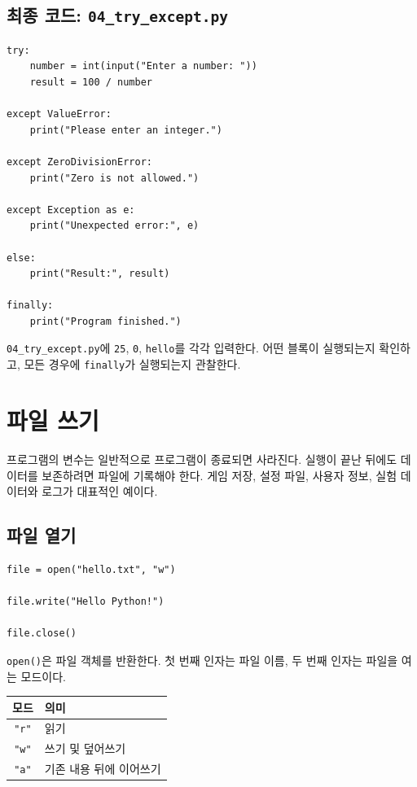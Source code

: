 \documentclass[11pt,a4paper]{article}
\begin{document}
\subsection{최종 코드: \texttt{04\_try\_except.py}}

\begin{lstlisting}
try:
    number = int(input("Enter a number: "))
    result = 100 / number

except ValueError:
    print("Please enter an integer.")

except ZeroDivisionError:
    print("Zero is not allowed.")

except Exception as e:
    print("Unexpected error:", e)

else:
    print("Result:", result)

finally:
    print("Program finished.")
\end{lstlisting}

\begin{practicebox}
\texttt{04\_try\_except.py}에 \texttt{25}, \texttt{0}, \texttt{hello}를 각각 입력한다. 어떤 블록이 실행되는지 확인하고, 모든 경우에 \texttt{finally}가 실행되는지 관찰한다.
\end{practicebox}

\section{파일 쓰기}

프로그램의 변수는 일반적으로 프로그램이 종료되면 사라진다. 실행이 끝난 뒤에도 데이터를 보존하려면 파일에 기록해야 한다. 게임 저장, 설정 파일, 사용자 정보, 실험 데이터와 로그가 대표적인 예이다.

\subsection{파일 열기}

\begin{lstlisting}
file = open("hello.txt", "w")

file.write("Hello Python!")

file.close()
\end{lstlisting}

\texttt{open()}은 파일 객체를 반환한다. 첫 번째 인자는 파일 이름, 두 번째 인자는 파일을 여는 모드이다.

\begin{center}
\begin{tabular}{cl}
\toprule
모드 & 의미 \\
\midrule
\texttt{"r"} & 읽기 \\
\texttt{"w"} & 쓰기 및 덮어쓰기 \\
\texttt{"a"} & 기존 내용 뒤에 이어쓰기 \\
\bottomrule
\end{tabular}
\end{center}
\end{document}
